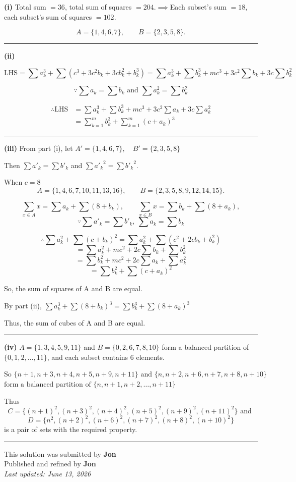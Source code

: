 \documentclass[12pt]{article}
\begin{document}
\newcommand{\ds}{\displaystyle}

\textbf{(i)} Total sum $=36$, total sum of squares $=204$.$\implies$Each subset's sum $=18$, each subset's sum of squares $=102$.

$$\boxed{A=\{1,4,6,7\},\qquad B=\{2,3,5,8\}.}$$


\bigskip\hrule\bigskip

\textbf{(ii)}

$$\text{LHS} = \sum a_k^3 + \sum\left(c^3+3c^2b_k+3cb_k^2+b_k^3\right)
= \sum a_k^3+\sum b_k^3 + mc^3 + 3c^2\sum b_k + 3c\sum b_k^2$$


$$\because \ds\sum a_k=\sum b_k \text{ and } \ds\sum a_k^2=\sum b_k^2$$

\begin{align*}
\therefore \text{LHS}&=\ds\sum a_k^3+\sum b_k^3 + mc^3 + 3c^2\sum a_k + 3c\sum a_k^2\\
&= \sum_{k=1}^{m} b_k^3 + \sum_{k=1}^{m} (c+a_k)^3
\end{align*}


\bigskip\hrule\bigskip
\textbf{(iii)} From part (i), let $\ds A'=\{1,4,6,7\},\quad B'=\{2,3,5,8\}$

Then $\ds\sum a'_k=\sum b'_k$ and $\ds\sum {a'_k}^2=\sum {b'_k}^2$.

When $c=8$
$$\boxed{A=\{1,4,6,7,10,11,13,16\},\qquad B=\{2,3,5,8,9,12,14,15\}.}$$

$$\sum_{x\in A}x=\sum a_k+\sum(8+b_k),\qquad \sum_{x\in B}x=\sum b_k+\sum(8+a_k),$$
$$\because \ds\sum a'_k=\sum b'_k,\ \sum a_k=\sum b_k$$


$$\therefore \sum a_k^2+\sum(c+b_k)^2=\sum a_k^2+\sum(c^2+2cb_k+b_k^2)$$
$$=\sum a_k^2+mc^2+2c\sum b_k+\sum b_k^2$$
$$=\sum b_k^2+mc^2+2c\sum a_k+\sum a_k^2$$
$$=\sum b_k^2+\sum(c+a_k)^2$$

So, the sum of squares of A and B are equal.

By part (ii), $\ds\sum a_k^3+\sum(8+b_k)^3=\sum b_k^3+\sum(8+a_k)^3$

Thus, the sum of cubes of A and B are equal.

\bigskip\hrule\bigskip
\textbf{(iv)} $A=\{1,3,4,5,9,11\}$ and $B=\{0,2,6,7,8,10\}$ form a balanced partition of $\{0,1,2,\dots,11\}$, and each subset contains $6$ elements.

$\ds\text{So }\{n+1,n+3,n+4,n+5,n+9,n+11\} \text{ and }\{n,n+2,n+6,n+7,n+8,n+10\}$
$\text{form a balanced partition of }\ds\{n,n+1,n+2,\dots,n+11\}$

Thus
$$\boxed{C=\{(n+1)^2,(n+3)^2,(n+4)^2,(n+5)^2,(n+9)^2,(n+11)^2\}} \text{  and } $$$$\boxed{D=\{n^2,(n+2)^2,(n+6)^2,(n+7)^2,(n+8)^2,(n+10)^2\}}$$
is a pair of sets with the required property.

\bigskip
\hrule
\begin{center}
    This solution was submitted by \textbf{Jon}\\[4pt]
    Published and refined by \textbf{Jon}\\[8pt]
    \textit{Last updated: June 13, 2026}
\end{center}
\end{document}
